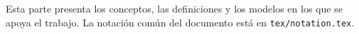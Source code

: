 
Esta parte presenta los conceptos, las definiciones y los modelos en los que se apoya el trabajo.
La notación común del documento está en \texttt{tex/notation.tex}.
